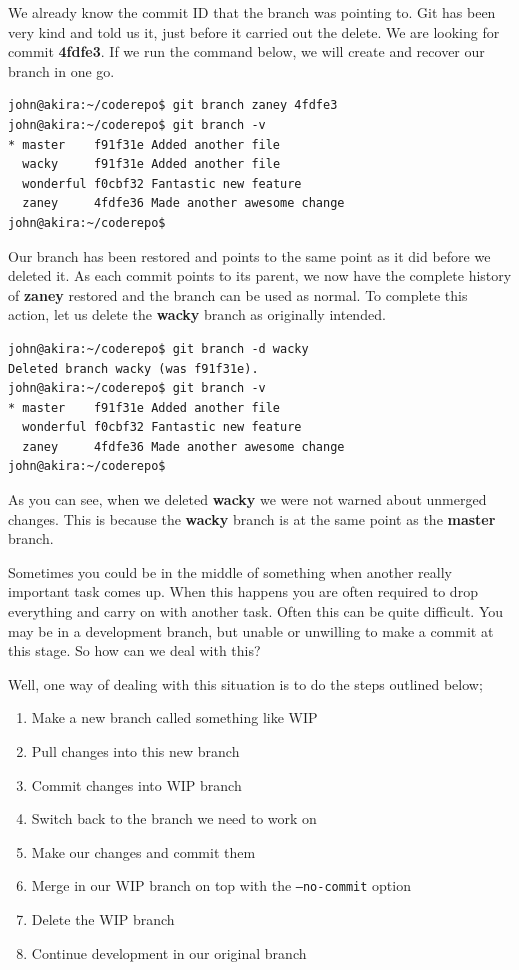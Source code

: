 We already know the commit ID that the branch was pointing to.  Git has been very kind and told us it, just before it carried out the delete.  We are looking for commit \textbf{4fdfe3}.  If we run the command below, we will create and recover our branch in one go.

\begin{Verbatim}[frame=leftline,framerule=1mm,fontsize=\relsize{-3}] 
john@akira:~/coderepo$ git branch zaney 4fdfe3
john@akira:~/coderepo$ git branch -v
* master    f91f31e Added another file
  wacky     f91f31e Added another file
  wonderful f0cbf32 Fantastic new feature
  zaney     4fdfe36 Made another awesome change
john@akira:~/coderepo$ 
\end{Verbatim}

Our branch has been restored and points to the same point as it did before we deleted it.  As each commit points to its parent, we now have the complete history of \textbf{zaney} restored and the branch can be used as normal.  To complete this action, let us delete the \textbf{wacky} branch as originally intended.

\begin{Verbatim}[frame=leftline,framerule=1mm,fontsize=\relsize{-3}] 
john@akira:~/coderepo$ git branch -d wacky
Deleted branch wacky (was f91f31e).
john@akira:~/coderepo$ git branch -v
* master    f91f31e Added another file
  wonderful f0cbf32 Fantastic new feature
  zaney     4fdfe36 Made another awesome change
john@akira:~/coderepo$ 
\end{Verbatim}

As you can see, when we deleted \textbf{wacky} we were not warned about unmerged changes.  This is because the \textbf{wacky} branch is at the same point as the \textbf{master} branch.  

Sometimes you could be in the middle of something when another really important task comes up.  When this happens you are often required to drop everything and carry on with another task.  Often this can be quite difficult.  You may be in a development branch, but unable or unwilling to make a commit at this stage.  So how can we deal with this?

Well, one way of dealing with this situation is to do the steps outlined below;

\begin{enumerate}
\item Make a new branch called something like WIP
\item Pull changes into this new branch
\item Commit changes into WIP branch
\item Switch back to the branch we need to work on
\item Make our changes and commit them
\item Merge in our WIP branch on top with the \texttt{--no-commit} option
\item Delete the WIP branch
\item Continue development in our original branch
\end{enumerate}

